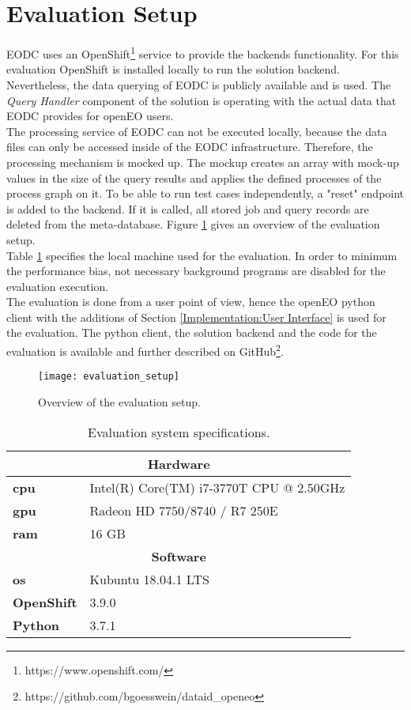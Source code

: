 \documentclass[draft,final]{vutinfth} %
\begin{document}
\section{Evaluation Setup}\label{Evaluation:Setup}

EODC uses an OpenShift\footnote{https://www.openshift.com/} service to provide the backends functionality. For this evaluation OpenShift is installed locally to run the solution backend. Nevertheless, the data querying of EODC is publicly available and is used. The \textit{Query Handler} component of the solution is operating with the actual data that EODC provides for openEO users. \\
The processing service of EODC can not be executed locally, because the data files can only be accessed inside of the EODC infrastructure. Therefore, the processing mechanism is mocked up. The mockup creates an array with mock-up values in the size of the query results and applies the defined processes of the process graph on it. To be able to run test cases independently, a "reset" endpoint is added to the backend. If it is called, all stored job and query records are deleted from the meta-database. Figure \ref{fig:evaluation_setup} gives an overview of the evaluation setup. \\
Table \ref{Tab:eva_hardware} specifies the local machine used for the evaluation. In order to minimum the performance bias, not necessary background programs are disabled for the evaluation execution.\\  
The evaluation is done from a user point of view, hence the openEO python client with the additions of Section \ref{Implementation:User Interface} is used for the evaluation. The python client, the solution backend and the code for the evaluation is available and further described on GitHub\footnote{https://github.com/bgoesswein/dataid\_openeo}. 

\begin{figure}[h]
	\centering
	\texttt{[image: evaluation\_setup]}
	\caption{Overview of the evaluation setup.}
	\label{fig:evaluation_setup} %
\end{figure}

\begin{table}[]
	\caption{Evaluation system specifications.}
	\centering
	\begin{tabular}{l|l}
		\multicolumn{2}{c}{\textbf{Hardware}} \\ \hline
		\textbf{\acrshort{cpu}} & Intel(R) Core(TM) i7-3770T CPU @ 2.50GHz \\ 
		\textbf{\acrshort{gpu}} & Radeon HD 7750/8740 / R7 250E  \\ 
		\textbf{\acrshort{ram}} & 16 GB  \\ 
		\multicolumn{2}{c}{\textbf{Software}} \\ \hline
		\textbf{\acrshort{os}} & Kubuntu 18.04.1 LTS \\ 
		\textbf{OpenShift} & 3.9.0  \\ 
		\textbf{Python} & 3.7.1  \\ 
	\end{tabular}
	\label{Tab:eva_hardware}
\end{table}
\end{document}
